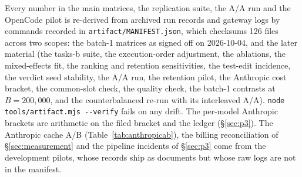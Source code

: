 \documentclass[10pt]{article}
\begin{document}
\begin{appendices}
Every number in the main matrices, the replication suite, the A/A run and the OpenCode pilot is
re-derived from archived run records and gateway logs by commands recorded in
\texttt{artifact/MANIFEST.json}, which checksums 126 files across two scopes: the batch-1 matrices as
signed off on 2026-10-04, and the later material (the tasks-b suite, the execution-order adjustment,
the ablations, the mixed-effects fit, the ranking and retention sensitivities, the test-edit
incidence, the verdict seed stability, the A/A run, the retention pilot, the Anthropic cost bracket,
the common-slot check, the quality check, the batch-1 contrasts at $B = 200{,}000$, and the
counterbalanced re-run with its interleaved A/A).
\texttt{node tools/artifact.mjs \mbox{-{}-verify}} fails on any drift. The per-model Anthropic brackets
are arithmetic on the filed bracket and the ledger (\S\ref{sec:p3}). The Anthropic cache A/B
(Table~\ref{tab:anthropicab}), the billing reconciliation of \S\ref{sec:measurement} and the
pipeline incidents of \S\ref{sec:p3} come from the development pilots, whose records ship as
documents but whose raw logs are not in the manifest.


\end{appendices}
\end{document}

